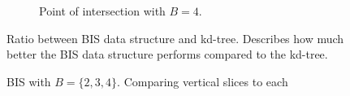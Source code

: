 \begin{figure}[h]
{\begin{subfigure}[b]{0.68\textwidth}
        \caption{Point of intersection with $B=4$.}
        \label{fig:4vert}
    \end{subfigure}
  }
  \caption{Ratio between BIS data structure and kd-tree. Describes how much better the BIS data structure performs compared to the kd-tree.}
  \label{fig:34vert}
  
\end{figure}

\begin{figure}[h]
  \caption{BIS with $B = \{2,3,4\}$. Comparing vertical slices to each}
  \label{fig:comparing_BIS}
  
\end{figure}


